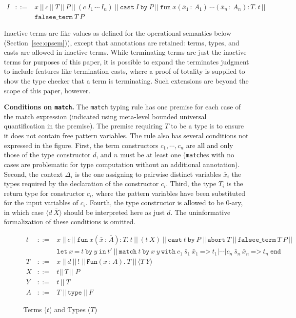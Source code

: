 \documentclass{fundam}
\newcommand{\Eq}[0]{\texttt{=}}
\newcommand{\bang}[0]{\texttt{!}}
\begin{document}
\begin{eqnarray*}
I & ::= & x\ ||\ c\ ||\ T\ ||\ P\ ||\ (c\ I_1\,\cdots\, I_n)\ ||\ 
\texttt{cast}\ I\ \texttt{by}\ P\ || \ 
 \texttt{fun}\ x(\bar{x}_1\,:\,A_1)\,\cdots(\bar{x}_n\,:\,A_n):T .\ t\ || \\
\ & \ & \texttt{falsee\_term}\ T\ P
\end{eqnarray*}

\noindent Inactive terms are like values as defined for the operational
semantics below (Section~\ref{sec:opsem})), except that annotations
are retained: terms, types, and casts are allowed in inactive terms.
While terminating terms are just the inactive terms for purposes of
this paper, it is possible to expand the terminates judgment to
include features like termination casts, where a proof of totality is
supplied to show the type checker that a term is terminating.  Such
extensions are beyond the scope of this paper, however.

\textbf{Conditions on \texttt{match}.} The \texttt{match} typing rule
has one premise for each case of the match expression (indicated using
meta-level bounded universal quantification in the premise).  The
premise requiring $T$ to be a type is to ensure it does not contain
free pattern variables.  The rule also has several conditions not
expressed in the figure.  First, the term constructors $c_1, \cdots,
c_n$ are all and only those of the type constructor $d$, and $n$ must
be at least one (\texttt{match}es with no cases are problematic for
type computation without an additional annotation).  Second, the
context $\Delta_i$ is the one assigning to pairwise distinct variables
$\bar{x}_i$ the types required by the declaration of the constructor
$c_i$.  Third, the type $T_i$ is the return type for constructor
$c_i$, where the pattern variables have been substituted for the input
variables of $c_i$.  Fourth, the type constructor is allowed to be
$0$-ary, in which case $\langle d\ \bar{X}\rangle$ should be
interpreted here as just $d$.  The uninformative formalization of
these conditions is omitted.

\begin{figure}
\begin{eqnarray*}
t & ::= & x\ ||\ c\ ||\ 
       \texttt{fun}\ x(\bar{x}\,:\,\bar{A}) : T .\ t\ ||\ (t\ X)\ ||\ 
        \texttt{cast}\ t\ \texttt{by}\ P  \ ||\ \texttt{abort}\ T\ ||\ \texttt{falsee\_term}\ T\ P\ ||\\
\ & \ & \texttt{let}\ x\ \Eq\ t\ \texttt{by}\ y\ \texttt{in}\ t' \ ||\  \texttt{match}\ t\ \texttt{by}\ x\ y \ \texttt{with}\ 
c_1\ \bar{s}_1\ \bar{x}_1\ \texttt{=>}\ t_1 |
 \cdots | c_n\ \bar{s}_n\ \bar{x}_n\ \texttt{=>}\ t_n\ \texttt{end}\\
T & ::= & x\ ||\ d\ ||\ \bang\ ||\ 
     \texttt{Fun}(x\,:\,A) . \ T\ ||\ \langle T\ Y\rangle \\
X & ::= & t ||\ T\ ||\ P \\
Y & ::= & t\ ||\ T \\
A & ::= & T\ ||\ \texttt{type}\ ||\ F 
\end{eqnarray*}
\caption{\label{fig:terms} Terms ($t$) and Types ($T$)}
\end{figure}
\end{document}
